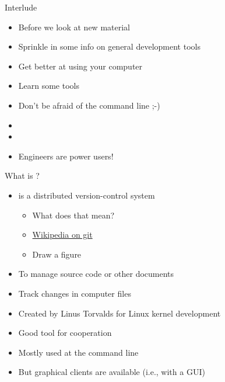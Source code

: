 \begin{frame}[fragile]{Interlude}
\begin{itemize}
\item Before we look at new material
\item Sprinkle in some info on general development tools
\item Get better at using your computer
\item Learn some tools
\item Don't be afraid of the command line ;-)
\item
\item
\item Engineers are power users!
\end{itemize}
\end{frame}

\begin{frame}[fragile]{What is ?}
\begin{itemize}
\item {} is a distributed version-control system
\begin{itemize}
\item What does that mean?
\item \href{https://en.wikipedia.org/wiki/Git}{Wikipedia on git}
\item Draw a figure
\end{itemize}
\item To manage source code or other documents
\item Track changes in computer files
\item Created by Linus Torvalds for Linux kernel development
\item Good tool for cooperation
\item Mostly used at the command line
\item But graphical clients are available (i.e., with a GUI)
\end{itemize}
\end{frame}


